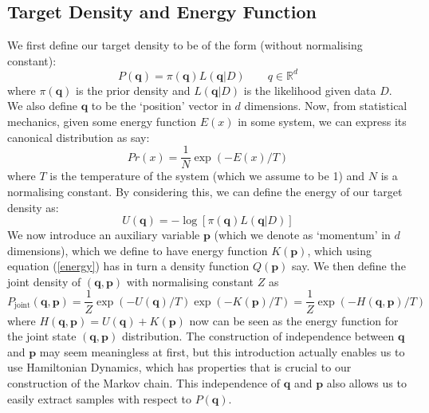 \documentclass[11pt]{article}
\begin{document}
\subsection{Target Density and Energy Function}
We first define our target density to be of the form (without normalising constant):
\begin{equation}
P(\mathbf{q})= \pi(\mathbf{q})L(\mathbf{q}|D) \quad \quad q \in \mathbb{R}^{d}
\end{equation}
where $\pi(\mathbf{q})$ is the prior density and $L(\mathbf{q}|D)$ is the likelihood given data $D$. 
We also define $\mathbf{q}$ to be the `position' vector in $d$ dimensions. Now, from statistical mechanics, given some energy function $E(x)$ in some system, we can express its canonical distribution as say:
\begin{equation}
\label{energy}
Pr(x) = \frac{1}{N}\exp(-E(x)/T)
\end{equation}
where $T$ is the temperature of the system (which we assume to be 1) and $N$ is a normalising constant. By considering this, we can define the energy of our target density as:
\begin{equation}
U(\mathbf{q}) = -\log [\pi(\mathbf{q})L(\mathbf{q}|D)]
\end{equation}
We now introduce an auxiliary variable $\mathbf{p}$ (which we denote as `momentum' in $d$ dimensions), which we define to have energy function $K(\mathbf{p})$, which using equation (\ref{energy}) has in turn a density function $Q(\mathbf{p})$ say. We then define the joint density of $(\mathbf{q},\mathbf{p})$ with normalising constant $Z$ as 
\begin{equation}
P_{\text{joint}}(\mathbf{q},\mathbf{p}) = \frac{1}{Z}\exp(-U(\mathbf{q})/T)\exp(-K(\mathbf{p})/T) = \frac{1}{Z}\exp(-H(\mathbf{q},\mathbf{p})/T)
\end{equation}
where $H(\mathbf{q},\mathbf{p}) = U(\mathbf{q}) + K(\mathbf{p})$ now can be seen as the energy function for the joint state $(\mathbf{q},\mathbf{p})$ distribution. The construction of independence between $\mathbf{q}$ and $\mathbf{p}$ may seem meaningless at first, but this introduction actually enables us to use Hamiltonian Dynamics, which has properties that is crucial to our construction of the Markov chain. This independence of $\mathbf{q}$ and $\mathbf{p}$ also allows us to easily extract samples with respect to $P(\mathbf{q})$.
\end{document}
